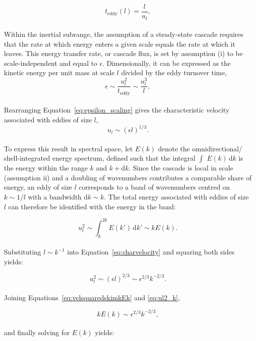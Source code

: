 \begin{equation}
	t_\mathrm{eddy}(l) = \frac{l}{u_l},
	\label{eq:teddy}
\end{equation}
\\
Within the inertial subrange, the assumption of a steady-state cascade requires that the rate at which energy enters a given scale equals the rate at which it leaves. This energy transfer rate, or cascade flux, is set by assumption (i) to be scale-independent and equal to $\epsilon$. Dimensionally, it can be expressed as the kinetic energy per unit mass at scale $l$ divided by the eddy turnover time,
\begin{equation}
	\epsilon \sim \frac{u_l^2}{t_\mathrm{eddy}} \sim \frac{u_l^3}{l},
	\label{eq:epsilon_scaling}
\end{equation}
\\
Rearranging Equation~\eqref{eq:epsilon_scaling} gives the characteristic velocity associated with eddies of size $l$,
\begin{equation}
	u_l \sim (\epsilon l)^{1/3}.
	\label{eq:charvelocity}
\end{equation}
\\
To express this result in spectral space, let $E(k)$ denote the omnidirectional/ shell-integrated energy spectrum, defined such that the integral $\int$ $E(k)\,\mathrm{d}k$ is the energy within the range $k$ and $k+\mathrm{d}k$. Since the cascade is local in scale (assumption ii) and a doubling of wavenumbers contributes a comparable share of energy, an eddy of size $l$ corresponds to a band of wavenumbers centred on $k \sim 1/l$ with a bandwidth $\mathrm{d}k \sim k$. The total energy associated with eddies of size $l$ can therefore be identified with the energy in the band:

\begin{equation}
	u_l^2 \sim \int_{k}^{2k} E(k')\,\mathrm{d}k' \sim k E(k).
	\label{eq:velsquaredskimkEk}
\end{equation}
\\
Substituting $l \sim k^{-1}$ into Equation~\eqref{eq:charvelocity} and squaring both sides yields:

\begin{equation}
	u_l^2 \sim (\epsilon l)^{2/3} \sim \epsilon^{2/3} k^{-2/3}.
	\label{eq:ul2_k}
\end{equation}
\\
Joining Equations~\eqref{eq:velsquaredskimkEk} and \eqref{eq:ul2_k},

\begin{equation}
	k E(k) \sim \epsilon^{2/3} k^{-2/3},
\end{equation}
\\
and finally solving for $E(k)$ yields:

